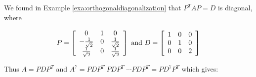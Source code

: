 \begin{solution}
We found in Example \ref{exa:orthogonaldiagonalization} that $P^TAP=D$ is diagonal, where 

\begin{equation*}
P= \left[ 
\begin{array}{ccc}
0 & 1 & 0 \\ 
-\frac{1}{\sqrt{2}} & 0 & \frac{1}{\sqrt{2}} \\ 
\frac{1}{\sqrt{2}} & 0 & \frac{1}{\sqrt{2}}
\end{array}
\right] \mbox{ and } 
D = \left[ 
\begin{array}{ccc}
1 & 0 & 0 \\ 
0 & 1 & 0 \\ 
0 & 0 & 2
\end{array}
\right]
\end{equation*}

Thus $A=PDP^T$ and $A^7=PDP^T \; PDP^T \; \cdots PDP^T = PD^7P^T$ which gives:


\end{solution}
